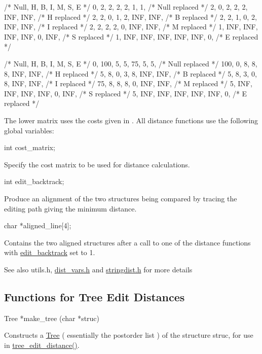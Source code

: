 \begin{DoxyVerb}/*  Null,   H,   B,   I,   M,   S,   E    */
   {   0,   2,   2,   2,   2,   1,   1},   /* Null replaced */
   {   2,   0,   2,   2,   2, INF, INF},   /* H    replaced */
   {   2,   2,   0,   1,   2, INF, INF},   /* B    replaced */
   {   2,   2,   1,   0,   2, INF, INF},   /* I    replaced */
   {   2,   2,   2,   2,   0, INF, INF},   /* M    replaced */
   {   1, INF, INF, INF, INF,   0, INF},   /* S    replaced */
   {   1, INF, INF, INF, INF, INF,   0},   /* E    replaced */


/* Null,   H,   B,   I,   M,   S,   E   */
   {   0, 100,   5,   5,  75,   5,   5},   /* Null replaced */
   { 100,   0,   8,   8,   8, INF, INF},   /* H    replaced */
   {   5,   8,   0,   3,   8, INF, INF},   /* B    replaced */
   {   5,   8,   3,   0,   8, INF, INF},   /* I    replaced */
   {  75,   8,   8,   8,   0, INF, INF},   /* M    replaced */
   {   5, INF, INF, INF, INF,   0, INF},   /* S    replaced */
   {   5, INF, INF, INF, INF, INF,   0},   /* E    replaced */
\end{DoxyVerb}


The lower matrix uses the costs given in \cite{shapiro:1990}. All distance functions use the following global variables\+:

\begin{DoxyVerb}int  cost_matrix;
\end{DoxyVerb}
 Specify the cost matrix to be used for distance calculations.

\begin{DoxyVerb}int   edit_backtrack;
\end{DoxyVerb}
 Produce an alignment of the two structures being compared by tracing the editing path giving the minimum distance.

\begin{DoxyVerb}char *aligned_line[4];
\end{DoxyVerb}
 Contains the two aligned structures after a call to one of the distance functions with \mbox{\hyperlink{dist__vars_8h_aa03194c513af6b860e7b33e370b82bdb}{edit\+\_\+backtrack}} set to 1.

\begin{DoxySeeAlso}{See also}
utils.\+h, \mbox{\hyperlink{dist__vars_8h}{dist\+\_\+vars.\+h}} and \mbox{\hyperlink{stringdist_8h}{stringdist.\+h}} for more details
\end{DoxySeeAlso}
\hypertarget{distance_measures_sec_tree_edit_distance}{}\subsection{Functions for Tree Edit Distances}\label{distance_measures_sec_tree_edit_distance}
\begin{DoxyVerb}Tree   *make_tree (char *struc)
\end{DoxyVerb}
 Constructs a \mbox{\hyperlink{structTree}{Tree}} ( essentially the postorder list ) of the structure \textquotesingle{}struc\textquotesingle{}, for use in \mbox{\hyperlink{treedist_8h_a3b21f1925f7071f46d93431a835217bb}{tree\+\_\+edit\+\_\+distance()}}.

